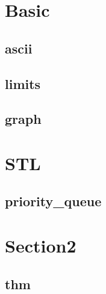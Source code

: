 \section{Basic}
    \subsection{ascii}
        
    \subsection{limits}
            
    \subsection{graph}
        

\section{STL}
    \subsection{priority_queue}
        
        
\section{Section2}
    \subsection{thm}
        